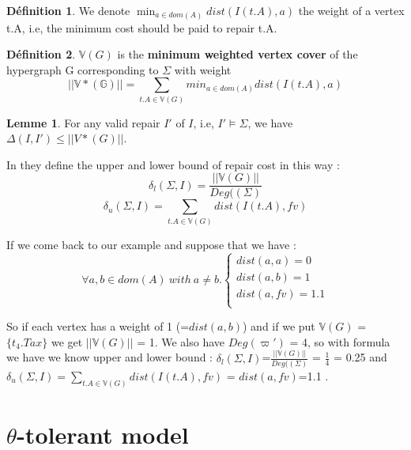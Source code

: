 \documentclass[letterpaper, 12pt]{report}
\theoremstyle{definition}
\newtheorem{mydef}{Définition}
\newtheorem{mylemma}{Lemme}
\begin{document}
\begin{mydef}
	We denote $ \min_{a \in dom(A)} dist(I(t.A),a) $ the weight of a vertex t.A, i.e, the minimum cost should be paid to repair t.A.
\end{mydef}

\begin{mydef}
	$\mathbb{V}(G)$ is the \textbf{minimum weighted vertex cover} of the hypergraph G corresponding to $\Sigma$ with weight
	$$||\mathbb{V*(G)}|| = \sum_{t.A \in \mathbb{V}(G)} min_{a\in dom(A)} dist(I(t.A),a)$$
\end{mydef}

\begin{mylemma}
	For any valid repair $I'$ of $I$, i.e, $I' \models \Sigma$, we have $\Delta(I,I') \leq ||V*(G)||$. 
\end{mylemma}


In \cite{main} they define the upper and lower bound of repair cost in this way :
$$ \delta_l(\Sigma,I) = \frac{||\mathbb{V}(G)||}{Deg((\Sigma)}$$
$$ \delta_u(\Sigma,I) = \sum_{t.A \in \mathbb{V}(G)} dist(I(t.A),fv)$$

If we come back to our example and suppose that we have :
$$
\forall a,b \in dom(A) \ with \ a \neq b.
\left\{
	\begin{array}{ll}
	   dist(a,a)=0\\
	   dist(a,b)=1\\
	   dist(a,fv)=1.1\\
	\end{array}
\right.
$$

So if each vertex has a weight of 1 (=$ dist(a,b)$) and if we put $\mathbb{V}(G)$ = $\{t_4.Tax \}$ we get $||\mathbb{V}(G)||$ = 1. We also have $Deg(\varpi')$ = 4, so with formula we have we know upper and lower bound : $\delta_l(\Sigma,I)$=$\frac{||\mathbb{V}(G)||}{Deg((\Sigma)}$ = $\frac{1}{4}$ = 0.25 and $\delta_u(\Sigma,I) = \sum_{t.A \in \mathbb{V}(G)} dist(I(t.A),fv)$ = $dist(a,fv)$=1.1 .


\section{$\theta$-tolerant model}
\end{document}
